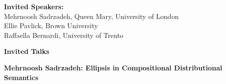 \documentclass[a4paper,11pt,oneside]{book}
\begin{document}
\begin{description}


\vspace{3mm}
\item{\bf Invited Speakers:}\vspace{2mm} \\
  Mehrnoosh Sadrzadeh, Queen Mary, University of London \\
  Ellie Pavlick,  Brown University \\
  Raffaella Bernardi, University of Trento



\end{description}


\clearpage




\begin{center}
  {\Large \bf Invited Talks}
\end{center}

\vspace*{0.5cm}

\textbf{Mehrnoosh Sadrzadeh: Ellipsis in Compositional Distributional Semantics}
\end{document}

